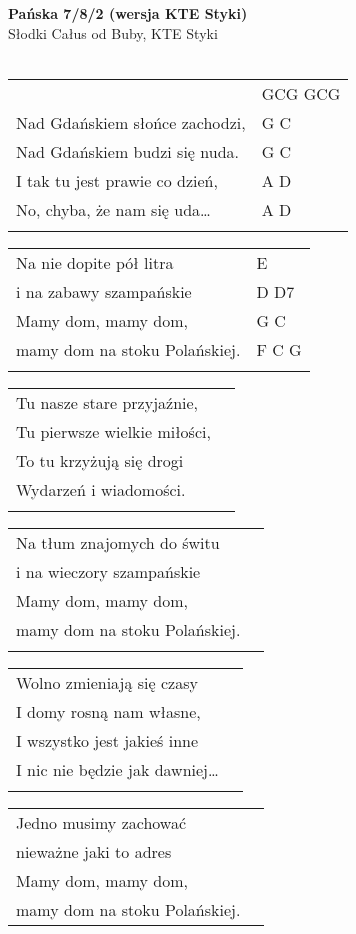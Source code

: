 \documentclass[a5paper]{article}
\begin{document}


\noindent
\fontsize{12pt}{15pt}\selectfont
\textbf{Pańska 7/8/2 (wersja KTE Styki)} \\
\fontsize{8pt}{10pt}\selectfont
Słodki Całus od Buby, KTE Styki \\ \\
\fontsize{10pt}{12pt}\selectfont
{}
\begin{tabular}{@{}p{7.50cm}p{3cm}@{}}
\noindent
& GCG GCG \\
Nad Gdańskiem słońce zachodzi, & G C \\
Nad Gdańskiem budzi się nuda. & G C \\
I tak tu jest prawie co dzień, & A D \\
No, chyba, że nam się uda… & A D \\ \\
\end{tabular}

\noindent
\begin{tabular}{@{}p{6.50cm}p{3cm}@{}}
	Na nie dopite pół litra & E \\
	i na zabawy szampańskie & D D7 \\
	Mamy dom, mamy dom, & G C \\
	mamy dom na stoku Polańskiej. & F C G \\ \\
\end{tabular}

\noindent
\begin{tabular}{@{}p{6.10cm}p{3cm}@{}}
Tu nasze stare przyjaźnie, \\
Tu pierwsze wielkie miłości, \\
To tu krzyżują się drogi \\
Wydarzeń i wiadomości. \\ \\
\end{tabular}

\noindent
\begin{tabular}{@{}p{6.60cm}p{3cm}@{}}
Na tłum znajomych do świtu \\
i na wieczory szampańskie \\
Mamy dom, mamy dom, \\
mamy dom na stoku Polańskiej. \\ \\
\end{tabular}

\noindent
\begin{tabular}{@{}p{6.10cm}p{3cm}@{}}
Wolno zmieniają się czasy \\
I domy rosną nam własne, \\
I wszystko jest jakieś inne \\
I nic nie będzie jak dawniej… \\ \\
\end{tabular}

\noindent
\begin{tabular}{@{}p{6.60cm}p{3cm}@{}}
Jedno musimy zachować \\
nieważne jaki to adres \\
Mamy dom, mamy dom, \\
mamy dom na stoku Polańskiej.
\end{tabular}
\end{document}
